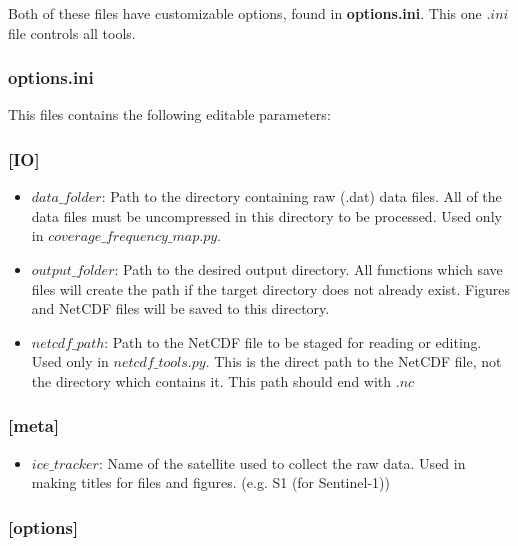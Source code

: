 \documentclass{article}
\begin{document}
        Both of these files have customizable options, found in \textbf{options.ini}. This one $.ini$ file controls all tools.

        \subsubsection*{\textbf{options.ini}}

            This files contains the following editable parameters:

        \subsubsection*{[IO]}

            \begin{itemize}
                \item $data\_folder$: Path to the directory containing raw (.dat) data files. All of the data files must be uncompressed in this directory to be processed. Used only in $coverage\_frequency\_map.py$.

                \item $output\_folder$: Path to the desired output directory. All functions which save files will create the path if the target directory does not already exist. Figures and NetCDF files will be saved to this directory.

                \item $netcdf\_path$: Path to the NetCDF file to be staged for reading or editing. Used only in $netcdf\_tools.py$. This is the direct path to the NetCDF file, not the directory which contains it. This path should end with $.nc$
            \end{itemize}

        \subsubsection*{[meta]}

            \begin{itemize}
                \item $ice\_tracker$: Name of the satellite used to collect the raw data. Used in making titles for files and figures. (e.g. S1 (for Sentinel-1))
            \end{itemize}

        \subsubsection*{[options]}
\end{document}
